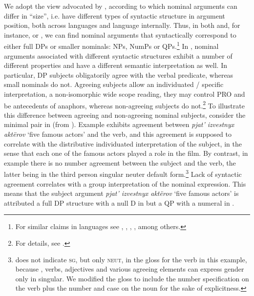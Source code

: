 \documentclass[output=paper
,modfonts
,nonflat]{langsci/langscibook}
\begin{document}
	We adopt the view advocated by \citet{Pereltsvaig2006}, according to which nominal arguments can differ in ``size'', i.e. have different types of syntactic structure in argument position, both across languages and language internally. Thus, in both  and, for instance,  or , we can find nominal arguments that syntactically correspond to either full DPs or smaller nominals: NPs, NumPs or QPs.\footnote{For similar claims in  languages see  \citet{Schmitt1999, Schmitt2003}, \citet{MunnSchmitt2005}, \citet{Dobrovie-Sorin2006}, \citet{Cyrino2015}, among others.} In , nominal arguments associated with different syntactic structures exhibit a number of different properties and have a different semantic interpretation as well. In particular, DP subjects obligatorily agree with the verbal predicate, whereas small nominals do not. Agreeing subjects allow an individuated / specific interpretation, a non-isomorphic wide scope reading, they may control PRO and be antecedents of anaphors, whereas non-agreeing subjects do not.\footnote{For details, see \citet[447]{Pereltsvaig2006}.} To illustrate this difference between agreeing and non-agreeing nominal subjects, consider the minimal pair in  (from \citealt[438--9, ex. 3]{Pereltsvaig2006}). Example  exhibits  agreement between \textit{pjat' izvestnyx akt\"erov} `five famous actors' and the verb, and this agreement is supposed to correlate with the distributive individuated interpretation of the subject, in the sense that each one of the famous actors played a role in the film. By contrast, in example  there is no number agreement between the subject and the verb, the latter being in the third person singular neuter default form.\footnote{\citet{Pereltsvaig2006} does not indicate \textsc{sg}, but only \textsc{neut}, in the gloss for the verb in this example, because , verbs, adjectives and various agreeing elements can express gender only in singular. We modified the gloss to include the number specification on the verb plus the number and case on the noun for the sake of explicitness.} Lack of syntactic agreement correlates with a group interpretation of the nominal expression. This means that the subject argument \textit{pjat' izvestnyx akt\"erov} `five famous actors' is attributed a full DP structure with a null D in  but a QP with a numeral in .
	
\end{document}
